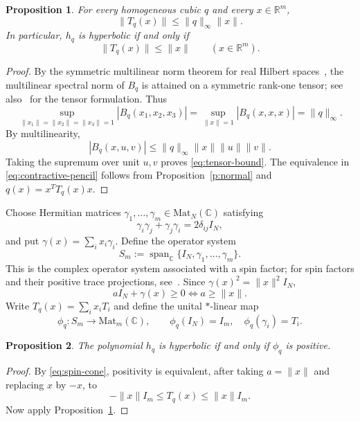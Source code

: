 \documentclass[11pt,onecolumn]{article}
\theoremstyle{blueplain}
\newtheorem{proposition}[proposition]{Proposition}
\theoremstyle{bluedefinition}
\theoremstyle{bluedefinition}
\newcommand{\R}{\mathbb R}
\newcommand{\C}{\mathbb C}
\newcommand{\M}{\mathrm{Mat}}
\begin{document}
\begin{proposition}\label{p:contract}
For every homogeneous cubic $q$ and every $x\in\R^m$,
\begin{equation}\label{eq:tensor-bound}
\|T_q(x)\|\leqslant\|q\|_\infty\|x\|.
\end{equation}
In particular, $h_q$ is hyperbolic if and only if
\begin{equation}\label{eq:contractive-pencil}
\|T_q(x)\|\leqslant\|x\|\qquad(x\in\R^m).
\end{equation}
\end{proposition}

\begin{proof}
By the symmetric multilinear norm theorem for real Hilbert
spaces~\cite{Banach}, the multilinear spectral norm of $B_q$ is attained
on a symmetric rank-one tensor; see also~\cite{Friedland} for
the tensor formulation.  Thus
\[
\sup_{\|x_1\|=\|x_2\|=\|x_3\|=1}|B_q(x_1,x_2,x_3)|
=
\sup_{\|x\|=1}|B_q(x,x,x)|
=\|q\|_\infty.
\]
By multilinearity,
\[
|B_q(x,u,v)|
\leqslant\|q\|_\infty\|x\|\|u\|\|v\|.
\]
Taking the supremum over unit $u,v$ proves \eqref{eq:tensor-bound}. The
equivalence in \eqref{eq:contractive-pencil}
follows from Proposition~\ref{p:normal} and $q(x)=x^TT_q(x)x$.
\end{proof}

Choose Hermitian matrices $\gamma_1,\ldots,\gamma_m\in \M_N(\C)$ satisfying
\[
\gamma_i\gamma_j+\gamma_j\gamma_i=2\delta_{ij}I_N,
\]
and put $\gamma(x)=\sum_i x_i\gamma_i$. Define the operator system
\[
S_m:=\operatorname{span}_\C\{I_N,\gamma_1,\ldots,\gamma_m\}.
\]
This is the complex operator system associated with a spin factor;
for spin factors and their positive trace projections, see~\cite{Stormer}.
Since $\gamma(x)^2=\|x\|^2I_N$,
\begin{equation}\label{eq:spin-cone}
aI_N+\gamma(x)\geqslant0
\Longleftrightarrow
a\geqslant\|x\|.
\end{equation}
Write $T_q(x)=\sum_i x_iT_i$ and define the unital $*$-linear map
\[
\phi_q\colon S_m\to \M_m(\C),\qquad
\phi_q(I_N)=I_m,\quad \phi_q(\gamma_i)=T_i.
\]

\begin{proposition}\label{p:spinpositive}
The polynomial $h_q$ is hyperbolic if and only if $\phi_q$ is positive.
\end{proposition}

\begin{proof}
By \eqref{eq:spin-cone}, positivity is equivalent, after taking
$a=\|x\|$ and replacing $x$ by $-x$, to
\[
-\|x\|I_m\leqslant T_q(x)\leqslant\|x\|I_m.
\]
Now apply Proposition~\ref{p:contract}.
\end{proof}
\end{document}
